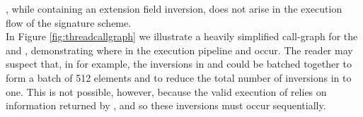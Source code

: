 \noindent
{}, while containing an extension field inversion, does not arise in the execution flow of the signature scheme.\\

In Figure \ref{fig:threadcallgraph} we illustrate a heavily simplified call-graph for the  and , demonstrating where in the execution pipeline  and  occur. The reader may suspect that, in  for example, the inversions in  and  could be batched together to form a batch of 512 elements and to reduce the total number of inversions in  to one. This is not possible, however, because the valid execution of  relies on information returned by , and so these inversions must occur sequentially.

